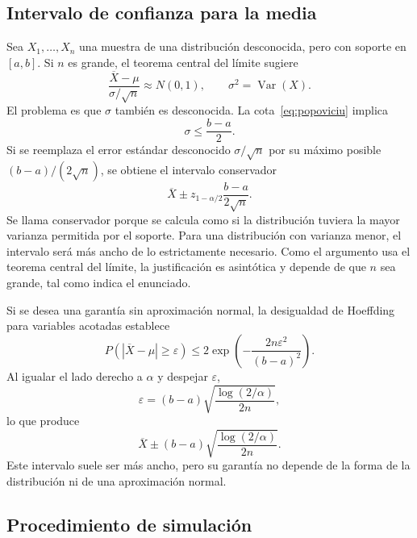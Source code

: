 \documentclass[10pt,a4paper,oneside]{article}
\newcommand{\Var}{\operatorname{Var}}
\begin{document}
\subsection*{Intervalo de confianza para la media}

Sea $X_1,\ldots,X_n$ una muestra de una distribución desconocida, pero con soporte en $[a,b]$. Si $n$ es grande, el teorema central del límite sugiere
\begin{equation*}
\frac{\overline X-\mu}{\sigma/\sqrt n}\approx N(0,1),
\qquad \sigma^2=\Var(X).
\end{equation*}
El problema es que $\sigma$ también es desconocida. La cota~\eqref{eq:popoviciu} implica
\begin{equation*}
\sigma\leq\frac{b-a}{2}.
\end{equation*}
Si se reemplaza el error estándar desconocido $\sigma/\sqrt n$ por su máximo posible $(b-a)/(2\sqrt n)$, se obtiene el intervalo conservador
\begin{equation}
\boxed{
\overline X\pm z_{1-\alpha/2}\frac{b-a}{2\sqrt n}.}
\label{eq:ic-acotada}
\end{equation}
Se llama conservador porque se calcula como si la distribución tuviera la mayor varianza permitida por el soporte. Para una distribución con varianza menor, el intervalo será más ancho de lo estrictamente necesario. Como el argumento usa el teorema central del límite, la justificación es asintótica y depende de que $n$ sea grande, tal como indica el enunciado.

Si se desea una garantía sin aproximación normal, la desigualdad de Hoeffding para variables acotadas establece
\begin{equation*}
P(|\overline X-\mu|\geq\varepsilon)
\leq2\exp\!\left(-\frac{2n\varepsilon^2}{(b-a)^2}\right).
\end{equation*}
Al igualar el lado derecho a $\alpha$ y despejar $\varepsilon$,
\begin{equation*}
\varepsilon=(b-a)\sqrt{\frac{\log(2/\alpha)}{2n}},
\end{equation*}
lo que produce
\begin{equation*}
\boxed{
\overline X\pm(b-a)\sqrt{\frac{\log(2/\alpha)}{2n}}.}
\end{equation*}
Este intervalo suele ser más ancho, pero su garantía no depende de la forma de la distribución ni de una aproximación normal.

\subsection*{Procedimiento de simulación}
\end{document}
